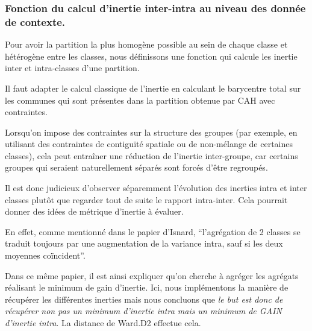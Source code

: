 \documentclass[
]{article}
\begin{document}
\hypertarget{fonction-du-calcul-dinertie-inter-intra-au-niveau-des-donnuxe9e-de-contexte.}{%
\subsubsection{Fonction du calcul d'inertie inter-intra au niveau des
donnée de
contexte.}\label{fonction-du-calcul-dinertie-inter-intra-au-niveau-des-donnuxe9e-de-contexte.}}

Pour avoir la partition la plus homogène possible au sein de chaque
classe et hétérogène entre les classes, nous définissons une fonction
qui calcule les inertie inter et intra-classes d'une partition.

Il faut adapter le calcul classique de l'inertie en calculant le
barycentre total sur les communes qui sont présentes dans la partition
obtenue par CAH avec contraintes.

Lorsqu'on impose des contraintes sur la structure des groupes (par
exemple, en utilisant des contraintes de contiguïté spatiale ou de
non-mélange de certaines classes), cela peut entraîner une réduction de
l'inertie inter-groupe, car certains groupes qui seraient naturellement
séparés sont forcés d'être regroupés.

Il est donc judicieux d'observer séparemment l'évolution des inerties
intra et inter classes plutôt que regarder tout de suite le rapport
intra-inter. Cela pourrait donner des idées de métrique d'inertie à
évaluer.

En effet, comme mentionné dans le papier d'Isnard, ``l'agrégation de 2
classes se traduit toujours par une augmentation de la variance intra,
sauf si les deux moyennes coïncident''.

Dans ce même papier, il est ainsi expliquer qu'on cherche à agréger les
agrégats réalisant le minimum de gain d'inertie. Ici, nous implémentons
la manière de récupérer les différentes inerties mais nous concluons que
\emph{le but est donc de récupérer non pas un minimum d'inertie intra
mais un minimum de GAIN d'inertie intra}. La distance de Ward.D2
effectue cela.
\end{document}
